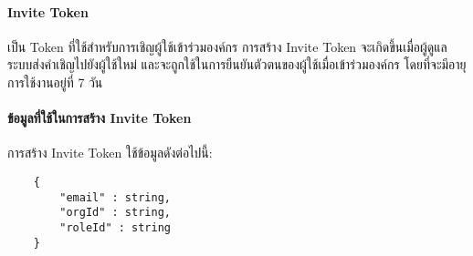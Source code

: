 \paragraph{Invite Token}
เป็น Token ที่ใช้สำหรับการเชิญผู้ใช้เข้าร่วมองค์กร การสร้าง Invite Token จะเกิดขึ้นเมื่อผู้ดูแลระบบส่งคำเชิญไปยังผู้ใช้ใหม่ และจะถูกใช้ในการยืนยันตัวตนของผู้ใช้เมื่อเข้าร่วมองค์กร โดยที่จะมีอายุการใช้งานอยู่ที่ 7 วัน

\paragraph{ข้อมูลที่ใช้ในการสร้าง Invite Token}
การสร้าง Invite Token ใช้ข้อมูลดังต่อไปนี้:
\begin{lstlisting}
    {
        "email" : string,
        "orgId" : string,
        "roleId" : string
    }
\end{lstlisting}
\fi